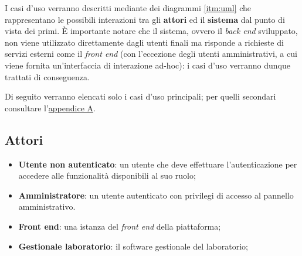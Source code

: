 I casi d'uso verranno descritti mediante dei diagrammi \ref{itm:uml} che rappresentano le possibili interazioni tra gli \textbf{attori} ed il \textbf{sistema} dal punto di vista dei primi. È importante notare che il sistema, ovvero il \textit{back end} sviluppato, non viene utilizzato direttamente dagli utenti finali ma risponde a richieste di servizi esterni come il \textit{front end} (con l'eccezione degli utenti amministrativi, a cui viene fornita un'interfaccia di interazione ad-hoc): i casi d'uso verranno dunque trattati di conseguenza.

Di seguito verranno elencati solo i casi d'uso principali; per quelli secondari consultare l'\hyperref[sec:AppendixA]{appendice A}.
\subsection{Attori}
\begin{itemize}
    \item \textbf{Utente non autenticato}: un utente che deve effettuare l'autenticazione per accedere alle funzionalità disponibili al suo ruolo;
    \item \textbf{Amministratore}: un utente autenticato con privilegi di accesso al pannello amministrativo.
    \item \textbf{Front end}: una istanza del \textit{front end} della piattaforma;
    \item \textbf{Gestionale laboratorio}: il software gestionale del laboratorio;
\end{itemize}
